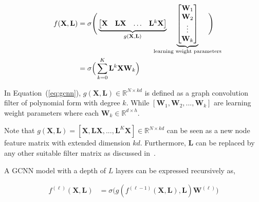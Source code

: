 \documentclass{article}
\begin{document}
\vspace{-1em}
\begin{equation}\label{eq:gcnn}
\begin{split}
f(\mathbf{X}, \mathbf{L}) &  = \sigma\Bigg( 
\underbrace{ \begin{bmatrix} \mathbf{X} & \mathbf{L} \mathbf{X} & \dots &\mathbf{L}^k \mathbf{X} \end{bmatrix}}_{{g(\mathbf{X}, \mathbf{L})}} \hspace{-2em}  \underbrace{  \begin{bmatrix}
	\mathbf{W}_1   \\
	\mathbf{W}_2   \\
	\vdots \\
	\mathbf{W}_k   \\
	\end{bmatrix}}_{\text{learning weight parameters}}\hspace{-2em}  \Bigg)\\  
& = \sigma\Big(\sum_{k=0}^{K} \mathbf{L}^{k}\mathbf{X}\mathbf{W}_k \Big)\\
\end{split}
\end{equation}



 
In Equation~(\ref{eq:gcnn}),  $g(\mathbf{X},\mathbf{L}) \in \mathbb{R}^{N \times k   d} $ is defined as a graph convolution filter of polynomial form with degree $k$. While $[\mathbf{W}_1, \mathbf{W}_2,  ..., \mathbf{W}_k]$ are learning weight parameters where each $\mathbf{W}_k \in \mathbb{R}^{d \times h}$. 

Note that $g(\mathbf{X}, \mathbf{L})=[\mathbf{X}, \mathbf{L}\mathbf{X},..., \mathbf{L}^{K}\mathbf{X}] \in \mathbb{R}^{N \times k  d}$  can be seen as a new node feature matrix with extended dimension $kd$\footnotemark\label{fnm:1}. Furthermore, $\mathbf{L}$  can be replaced by any other suitable filter matrix as discussed in~\cite{levie2017cayleynets, kipf2016semi}.


A GCNN model with  a depth of $L$  layers can  be  expressed recursively as, 

\begin{equation}\label{eq:layer_gcnn}
\begin{split}
f^{(\ell)}(\mathbf{X}, \mathbf{L}) & = \sigma \big( g(f^{(\ell-1)}(\mathbf{X}, \mathbf{L}), \mathbf{L}) \mathbf{W}^{(\ell)}\big) \\
\end{split}
\end{equation}
\end{document}
